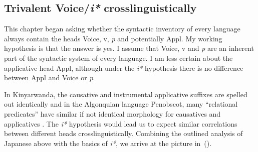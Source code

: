 	\subsection{Trivalent Voice/\textit{i*} crosslinguistically} \label{i:i:ay} \label{r1:g:1}
This chapter began asking whether the syntactic inventory of every language always contain the heads Voice, v, \textit{p} and potentially Appl. My working hypothesis is that the answer is yes. I assume that Voice, v and \emph{p} are an inherent part of the syntactic system of every language. I am less certain about the applicative head Appl, although under the \textit{i*} hypothesis there is no difference between Appl and Voice or \textit{p}. 

In Kinyarwanda, the causative and instrumental applicative suffixes are spelled out identically \citep{jerro17} and in the Algonquian language Penobscot, many ``relational predicates'' have similar if not identical morphology for causatives and applicatives \citep[Ch.~2.3.7.1]{quinn06phd}. The \emph{i*} hypothesis would lead us to expect similar correlations between different heads crosslinguistically. Combining the outlined analysis of Japanese above with the basics of \emph{i*}, we arrive at the picture in~(\nextx).




